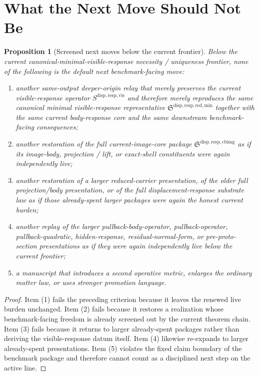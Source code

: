 \documentclass[11pt]{article}
\newcommand{\CurrentBodyImageCore}{\mathfrak S^{\mathrm{disp,resp,cbimg}}}
\newcommand{\VisibleResponseOperator}{S^{\mathrm{disp,resp,vis}}}
\newcommand{\MinimalReducedStructure}{\mathfrak S^{\mathrm{disp,resp,red,min}}}
\newtheorem{proposition}{Proposition}
\begin{document}
\section{What the Next Move Should Not Be}

\begin{proposition}[Screened next moves below the current frontier]
Below the current canonical-minimal-visible-response necessity / uniqueness frontier, none of the following is the default next benchmark-facing move:
\begin{enumerate}
    \item another same-output deeper-origin relay that merely preserves the current visible-response operator \(\VisibleResponseOperator\) and therefore merely reproduces the same canonical minimal visible-response representative \(\MinimalReducedStructure\) together with the same current body-response core and the same downstream benchmark-facing consequences;
    \item another restoration of the full current-image-core package \(\CurrentBodyImageCore\) as if its image-body, projection / lift, or exact-shell constituents were again independently live;
    \item another restoration of a larger reduced-carrier presentation, of the older full projection/body presentation, or of the full displacement-response substrate law as if those already-spent larger packages were again the honest current burden;
    \item another replay of the larger pullback-body-operator, pullback-operator, pullback-quadratic, hidden-response, residual-normal-form, or pre-proto-section presentations as if they were again independently live below the current frontier;
    \item a manuscript that introduces a second operative metric, enlarges the ordinary matter law, or uses stronger promotion language.
\end{enumerate}
\end{proposition}

\begin{proof}
Item (1) fails the preceding criterion because it leaves the renewed live burden unchanged. Item (2) fails because it restores a realization whose benchmark-facing freedom is already screened out by the current theorem chain. Item (3) fails because it returns to larger already-spent packages rather than deriving the visible-response datum itself. Item (4) likewise re-expands to larger already-spent presentations. Item (5) violates the fixed claim boundary of the benchmark package and therefore cannot count as a disciplined next step on the active line.
\end{proof}
\end{document}
